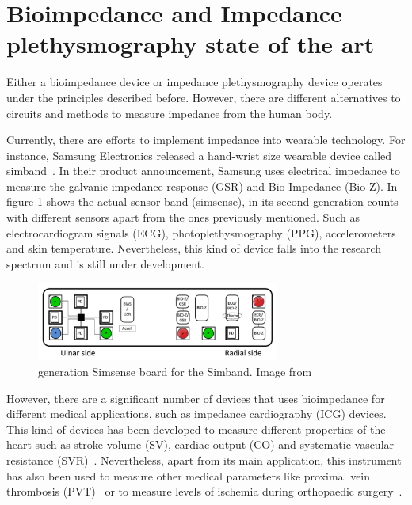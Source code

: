 \section{Bioimpedance and Impedance plethysmography state of the art} %
\label{section impedance 6}
Either a bioimpedance device or impedance plethysmography device operates under the principles described before. However, there are different alternatives to circuits and methods to measure impedance from the human body.  

Currently, there are efforts to implement impedance into wearable technology. For instance, Samsung Electronics released a hand-wrist size wearable device called simband~\cite{simsense}. In their product announcement, Samsung uses electrical impedance to measure the galvanic impedance response (GSR) and Bio-Impedance (Bio-Z). In figure \ref{fig:simsense} shows the actual sensor band (simsense), in its second generation counts with different sensors apart from the ones previously mentioned. Such as electrocardiogram signals (ECG), photoplethysmography (PPG),  accelerometers and skin temperature. Nevertheless, this kind of device falls into the research spectrum and is still under development.

\begin{figure}[!htpb]
	\centering
	\includegraphics[width=8cm,keepaspectratio]{figure10}    
	\caption[ generation Simsense board for the Simband]{ generation Simsense board for the Simband. Image from \cite{simsense}}
	\label{fig:simsense}
\end{figure}

However, there are a significant number of devices that uses bioimpedance for different medical applications, such as impedance cardiography (ICG) devices. This kind of devices has been developed to measure different properties of the heart such as stroke volume (SV), cardiac output (CO) and systematic vascular resistance (SVR)~\cite{neath2005utility}.  Nevertheless, apart from its main application, this instrument has also been used to measure other medical parameters like proximal vein thrombosis (PVT)~\cite{hull1978impedance} or to measure levels of ischemia during orthopaedic surgery~\cite{distefano1973bioelectrical}.

